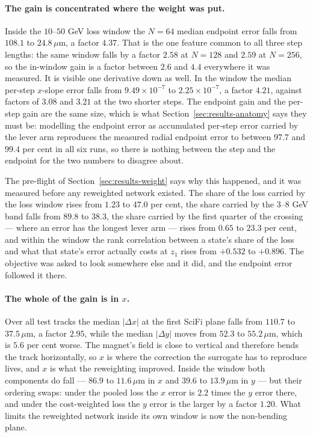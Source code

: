 \documentclass[11pt,a4paper]{article}
\newcommand{\um}{\ensuremath{\,\mu\mathrm{m}}}
\begin{document}
\paragraph{The gain is concentrated where the weight was put.} Inside the
$10$--$50$ GeV loss window the $N = 64$ median endpoint error falls from
$108.1$ to $24.8\um$, a factor $4.37$. That is the one feature common to all
three step lengths: the same window falls by a factor $2.58$ at $N = 128$ and
$2.59$ at $N = 256$, so the in-window gain is a factor between $2.6$ and $4.4$
everywhere it was measured. It is visible one derivative down as well. In the
window the median per-step $x$-slope error falls from $9.49\times10^{-7}$ to
$2.25\times10^{-7}$, a factor $4.21$, against factors of $3.08$ and $3.21$ at
the two shorter steps. The endpoint gain and the per-step gain are the same
size, which is what Section~\ref{sec:results-anatomy} says they must be:
modelling the endpoint error as accumulated per-step error carried by the
lever arm reproduces the measured radial endpoint error to between $97.7$ and
$99.4$ per cent in all six runs, so there is nothing between the step and the
endpoint for the two numbers to disagree about.

The pre-flight of Section~\ref{sec:results-weight} says why this happened, and
it was measured before any reweighted network existed. The share of the loss
carried by the loss window rises from $1.23$ to $47.0$ per cent, the share
carried by the $3$--$8$ GeV band falls from $89.8$ to $38.3$, the share carried
by the first quarter of the crossing --- where an error has the longest lever
arm --- rises from $0.65$ to $23.3$ per cent, and within the window the rank
correlation between a state's share of the loss and what that state's error
actually costs at $z_1$ rises from $+0.532$ to $+0.896$. The objective was
asked to look somewhere else and it did, and the endpoint error followed it
there.

\paragraph{The whole of the gain is in $x$.} Over all test tracks the median
$|\Delta x|$ at the first SciFi plane falls from $110.7$ to $37.5\um$, a factor
$2.95$, while the median $|\Delta y|$ moves from $52.3$ to $55.2\um$, which is
$5.6$ per cent worse. The magnet's field is close to vertical and therefore
bends the track horizontally, so $x$ is where the correction the surrogate has
to reproduce lives, and $x$ is what the reweighting improved. Inside the window
both components do fall --- $86.9$ to $11.6\um$ in $x$ and $39.6$ to
$13.9\um$ in $y$ --- but their ordering swaps: under the pooled loss the $x$
error is $2.2$ times the $y$ error there, and under the cost-weighted loss the
$y$ error is the larger by a factor $1.20$. What limits the reweighted network
inside its own window is now the non-bending plane.
\end{document}
